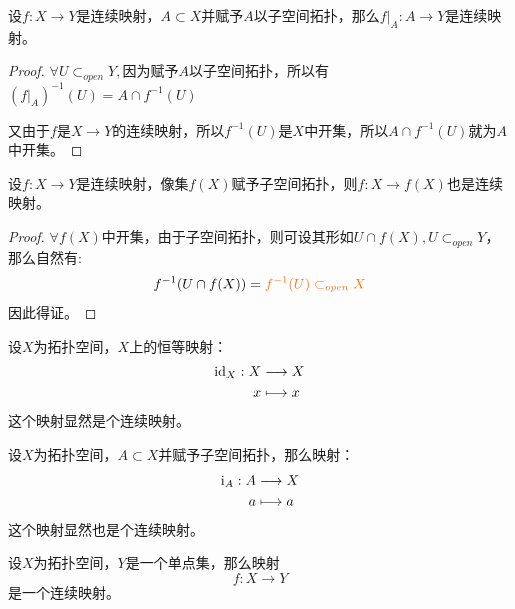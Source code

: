 \documentclass[lang=cn,10pt,device=pad]{elegantbook}
\newcommand{\tl}[1]{\textcolor{myor}{#1}}
\begin{document}
\begin{proposition}[连续映射之限制是连续映射]
	设$f:X\longrightarrow Y$是连续映射，$A\subset X$并赋予$A$以子空间拓扑，那么$f|_{A}:A\longrightarrow Y$是连续映射。
\end{proposition}
\begin{proof}
	$\forall U\subset_{open} Y, $因为赋予$A$以子空间拓扑，所以有$(f|_{A})^{-1}(U) = A\cap f^{-1}(U)$
	
	又由于$f$是$X\longrightarrow Y$的连续映射，所以$f^{-1}(U)$是$X$中开集，所以$A\cap f^{-1}(U)$就为$A$中开集。
\end{proof}
\begin{proposition}[连续映射之嵌入是连续映射]\label{c2-m3}
	设$f:X\longrightarrow Y$是连续映射，像集$f(X)$赋予子空间拓扑，则$f:X\longrightarrow f(X)$也是连续映射。
\end{proposition}
\begin{proof}
	\tl{$\forall f(X)$中开集}，由于子空间拓扑，则可设其形如$U\cap f(X) , U\subset_{open}Y$，那么自然有:$$f^{-1}(U\cap f(X)) = \tl{f^{-1}(U)\subset_{open}X}$$
	因此得证。
\end{proof}
\begin{example}[拓扑上的恒等变换是连续映射]
	设$X$为拓扑空间，$X$上的恒等映射：
	\begin{equation*}
		\begin{aligned}
			{\rm{id}}_{X} : X & \longrightarrow X\\
			x&\longmapsto x
		\end{aligned}
	\end{equation*}
	这个映射显然是个连续映射。
\end{example}
\begin{example}[拓扑上的嵌入映射是连续映射]
	设$X$为拓扑空间，$A\subset X$并赋予子空间拓扑，那么映射：
	\begin{equation*}
		\begin{aligned}
			{\rm{i}}_{A} : A & \longrightarrow X\\
			a&\longmapsto a
		\end{aligned}
	\end{equation*}
	这个映射显然也是个连续映射。
\end{example}
\begin{example}
	设$X$为拓扑空间，$Y$是一个单点集，那么映射
	\begin{equation*}
		f:X\longrightarrow Y
	\end{equation*}
	是一个连续映射。
\end{example}
\end{document}
